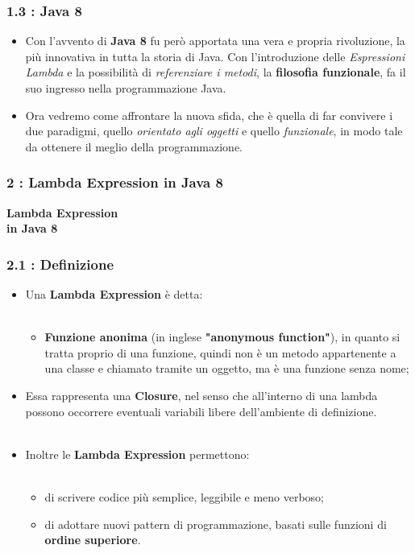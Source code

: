 \documentclass{beamer}
\begin{document}

\begin{frame}
	\frametitle{\textbf{1.3 : Java 8}}
	\begin{itemize}
		\item
			Con l'avvento di \textbf{Java 8} fu però apportata una vera e propria rivoluzione, la più innovativa in tutta la storia di Java. Con l'introduzione delle \textit{Espressioni Lambda} e la possibilità di \textit{referenziare i metodi}, la \textbf{filosofia funzionale}, fa il suo ingresso nella programmazione Java.
		\item
			Ora vedremo come affrontare la nuova sfida, che è quella di far convivere i due paradigmi, quello \textit{orientato agli oggetti} e quello \textit{funzionale}, in modo tale da ottenere il meglio della programmazione.				
	\end{itemize}
\end{frame}


\begin{frame}
	\frametitle{\textbf{2 : Lambda Expression in Java 8}}
	\begin{center}
		\textbf{\Huge Lambda Expression\\ in Java 8}
	\end{center}
\end{frame}


\begin{frame}
	\frametitle{\textbf{2.1 : Definizione}}
	\begin{itemize}
			\item
				Una \textbf{Lambda Expression} è detta:\\\
				\begin{itemize}
					\item
						\textbf{Funzione anonima} (in inglese \textbf{"anonymous function"}), in quanto si tratta proprio di una funzione, quindi non è un metodo appartenente a una classe e chiamato tramite un oggetto, ma è una funzione senza nome;
				
				\end{itemize}
				\item 
			Essa rappresenta una \textbf{Closure}, nel senso che all'interno di una lambda possono occorrere eventuali variabili libere dell'ambiente di definizione.\\\
			\item
				Inoltre le \textbf{Lambda Expression} permettono:\\\
				\begin{itemize}
					\item
						di scrivere codice più semplice, leggibile e meno verboso;
					\item
						di adottare nuovi pattern di programmazione, basati sulle funzioni di \textbf{ordine superiore}.
				\end{itemize}				
	\end{itemize}
\end{frame}
\end{document}
